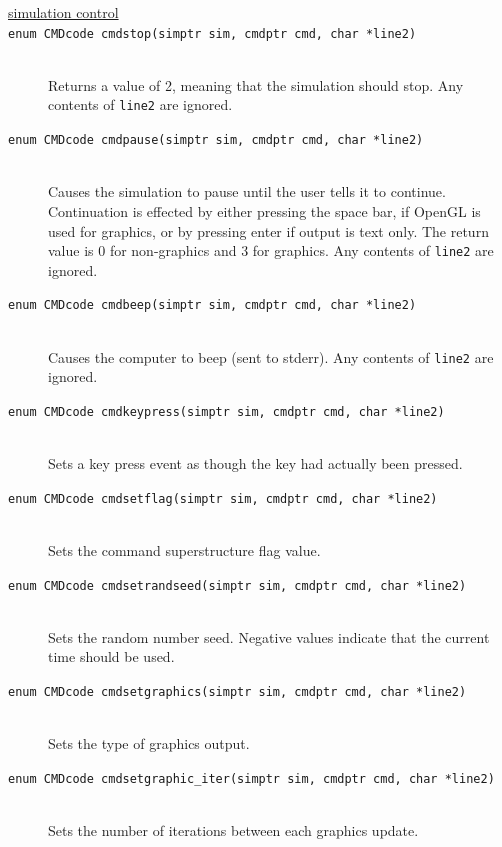 \documentclass {scrbook}
\newcommand {\ttt} {\texttt}
\begin{document}
\begin{description}

\item[\underline{simulation control}]

\item[\ttt{enum CMDcode cmdstop(simptr sim, cmdptr cmd, char *line2)}]
\hfill \\
Returns a value of 2, meaning that the simulation should stop. Any contents of \ttt{line2} are ignored.

\item[\ttt{enum CMDcode cmdpause(simptr sim, cmdptr cmd, char *line2)}]
\hfill \\
Causes the simulation to pause until the user tells it to continue. Continuation is effected by either pressing the space bar, if OpenGL is used for graphics, or by pressing enter if output is text only. The return value is 0 for non-graphics and 3 for graphics. Any contents of \ttt{line2} are ignored.

\item[\ttt{enum CMDcode cmdbeep(simptr sim, cmdptr cmd, char *line2)}]
\hfill \\
Causes the computer to beep (sent to stderr). Any contents of \ttt{line2} are ignored.

\item[\ttt{enum CMDcode cmdkeypress(simptr sim, cmdptr cmd, char *line2)}]
\hfill \\
Sets a key press event as though the key had actually been pressed.

\item[\ttt{enum CMDcode cmdsetflag(simptr sim, cmdptr cmd, char *line2)}]
\hfill \\
Sets the command superstructure flag value.

\item[\ttt{enum CMDcode cmdsetrandseed(simptr sim, cmdptr cmd, char *line2)}]
\hfill \\
Sets the random number seed. Negative values indicate that the current time should be used.

\item[\ttt{enum CMDcode cmdsetgraphics(simptr sim, cmdptr cmd, char *line2)}]
\hfill \\
Sets the type of graphics output.

\item[\ttt{enum CMDcode cmdsetgraphic\_iter(simptr sim, cmdptr cmd, char *line2)}]
\hfill \\
Sets the number of iterations between each graphics update.


\end{description}
\end{document}
